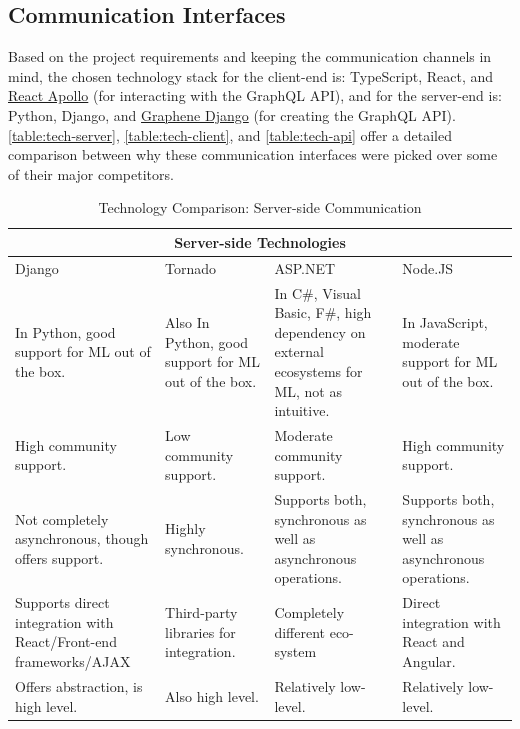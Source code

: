 \subsection{Communication Interfaces}
Based on the project requirements and keeping the communication channels in mind, the chosen technology stack for the client-end is: TypeScript, React, and \href{https://github.com/apollographql/react-apollo}{React Apollo} (for interacting with the GraphQL API), and for the server-end is: Python, Django, and \href{https://github.com/graphql-python/graphene-django}{Graphene Django} (for creating the GraphQL API). \autoref{table:tech-server}, \autoref{table:tech-client}, and \autoref{table:tech-api} offer a detailed comparison between why these communication interfaces were picked over some of their major competitors.
\begin{table}
\begin{tabular}{ @{}|p{4cm}||p{3cm}||p{4cm}||p{3cm}|  }
 \hline
 \multicolumn{4}{|c|}{\textbf{Server-side Technologies}} \\
 \hline
 Django & Tornado & ASP.NET & Node.JS\\
 \hline
 In Python, good support for ML out of the box.   & Also In Python, good support for ML out of the box.    & In C\#, Visual Basic, F\#, high dependency on external ecosystems for ML, not as intuitive. & In JavaScript, moderate support for ML out of the box.\\
 High community support.&   Low community support.  & Moderate community support. & High community support.\\
 Not completely asynchronous, though offers support. &  Highly synchronous. & Supports both, synchronous as well as asynchronous operations. & Supports both, synchronous as well as asynchronous operations. \\
 Supports direct integration with React/Front-end frameworks/AJAX & Third-party libraries for integration. & Completely different eco-system & Direct integration with React and Angular.\\
 Offers abstraction, is high level. & Also high level.  & Relatively low-level. & Relatively low-level.\\
 \hline
\end{tabular}
\caption{Technology Comparison: Server-side Communication}
\label{table:tech-server}
\end{table}
